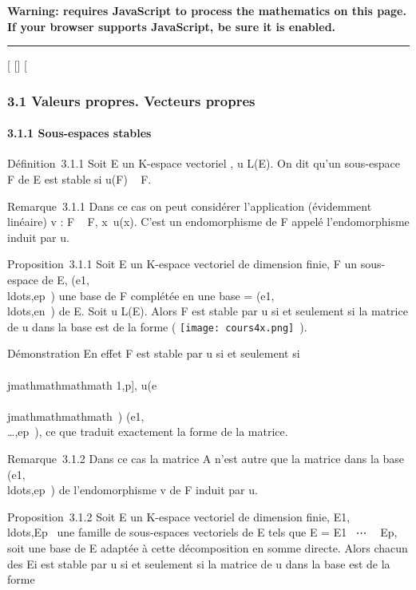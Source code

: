 \textbf{Warning: 
requires JavaScript to process the mathematics on this page.\\ If your
browser supports JavaScript, be sure it is enabled.}

\begin{center}\rule{3in}{0.4pt}\end{center}

{[}
{[}{]}
{[}

\subsubsection{3.1 Valeurs propres. Vecteurs propres}

\paragraph{3.1.1 Sous-espaces stables}

Définition~3.1.1 Soit E un K-espace vectoriel , u \in L(E). On dit qu'un
sous-espace F de E est stable si u(F) \subset~ F.

Remarque~3.1.1 Dans ce cas on peut considérer l'application (évidemment
linéaire) v : F \rightarrow~ F, x\mapsto~u(x). C'est un
endomorphisme de F appelé l'endomorphisme induit par u.

Proposition~3.1.1 Soit E un K-espace vectoriel de dimension finie, F un
sous-espace de E,
(e1,\\ldots,ep~)
une base de F complétée en une base  =
(e1,\\ldots,en~)
de E. Soit u \in L(E). Alors F est stable par u si et seulement si la
matrice de u dans la base  est de la forme \left (
\texttt{[image: cours4x.png]} \,\right ).

Démonstration En effet F est stable par u si et seulement si
\forall~\\\\jmathmathmathmath \in {[}1,p{]}, u(e\\\\jmathmathmathmath~)
\in\mathrmVect(e1,\\\ldots,ep~),
ce que traduit exactement la forme de la matrice.

Remarque~3.1.2 Dans ce cas la matrice A n'est autre que la matrice dans
la base
(e1,\\ldots,ep~)
de l'endomorphisme v de F induit par u.

Proposition~3.1.2 Soit E un K-espace vectoriel de dimension finie,
E1,\\ldots,Ep~
une famille de sous-espaces vectoriels de E tels que E = E1
\oplus~⋯ \oplus~ Ep, soit  une base de E
adaptée à cette décomposition en somme directe. Alors chacun des
Ei est stable par u si et seulement si la matrice de u dans la
base  est de la forme

